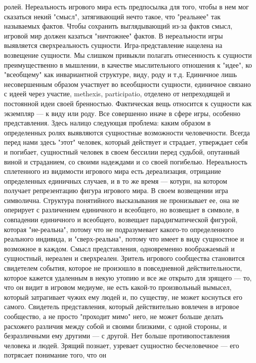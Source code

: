 \documentclass[12pt]{article}
\begin{document}
ролей. Нереальность игрового мира есть предпосылка для того, чтобы в нем мог сказаться некий "смысл",
затягивающий нечто такое, что "реальнее" так называемых фактов. Чтобы сохранить выглядывающий из-за
фактов  смысл,  игровой  мир  должен  казаться  "ничтожнее"  фактов.  В  нереальности  игры  выявляется
сверхреальность сущности. Игра-представление нацелена на возвещение сущности. Мы слишком привыкли
полагать отнесенность к сущности преимущественно в мышлении, в качестве мыслительного отношения к
"идее", ко "всеобщему" как инвариантной структуре, виду, роду и т.д. Единичное лишь несовершенным образом
участвует во всеобщности сущности, единичное связано с идеей через участие, methexis, participatio, отделено
от непреходящей и постоянной идеи своей бренностью. Фактическая вещь относится к сущности как экземпляр
--- к виду или роду. Все совершенно иначе в сфере игры, особенно представления. Здесь налицо следующая
проблема: каким образом в определенных ролях выявляются сущностные возможности человечности. Всегда
перед  нами  здесь  "этот"  человек, который действует и страдает, утверждает себя и погибает, сущностный
человек в своем бессилии перед судьбой, опутанный виной и страданием, со своими надеждами и со своей
погибелью.  Нереальность  сплетенного  из  видимости  игрового  мира  есть  дереализация,  отрицание
определенных единичных случаев, и в то же время --- котурн, на котором получает репрезентацию фигура
игрового мира. В своем возвещении игра символична. Структура понятийного высказывания не пронизывает ее,
она не оперирует с различением единичного и всеобщего, но возвещает в символе, в совпадении единичного и
всеобщего, возвещает парадигматической фигурой, которая "не-реальна", потому что не подразумевает какого-то определенного реального индивида, и "сверх-реальна", потому что имеет в виду сущностное и возможное в
каждом. Смысл представления, одновременно воображаемый и сущностный, нереален и сверхреален. Зритель
игрового сообщества становится свидетелем события, которое не произошло в повседневной действительности,
которое кажется удаленным в некую утопию и все же открыто для зрящего --- то, что он видит в игровом
медиуме, не есть какой-то произвольный вымысел, который затрагивает чужих ему людей и, по существу, не
может коснуться его самого. Свидетель представления, который действительно вовлечен в игровое сообщество,
а  не  просто  "проходит  мимо"  него,  не  может  больше  делать  расхожего  различия  между  собой  и  своими
близкими,  с  одной  стороны,  и  безразличными  ему  другими  ---  с  другой.  Нет  больше  противопоставления
человека и людей. Зрящий познает, узревает сущностно бесчеловечное --- его потрясает понимание того, что он
\end{document}
